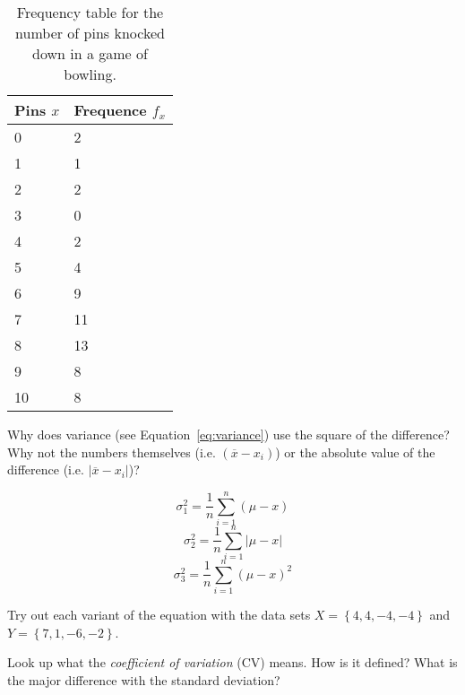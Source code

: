 \begin{table}
  \centering
  \begin{tabular}{@{}ll@{}}
    \toprule
    Pins $x$ & Frequence $f_{x}$ \\ \midrule
    0        & 2                 \\
    1        & 1                 \\
    2        & 2                 \\
    3        & 0                 \\
    4        & 2                 \\
    5        & 4                 \\
    6        & 9                 \\
    7        & 11                \\
    8        & 13                \\
    9        & 8                 \\
    10       & 8                 \\ \bottomrule
  \end{tabular}
  \caption{Frequency table for the number of pins knocked down in a game of bowling.}
  \label{tab:pinfreq}
\end{table}

\begin{exercise}
  \label{ex:variance-formula}
  Why does variance (see Equation~\ref{eq:variance}) use the square of the difference? Why not the numbers themselves (i.e. $(\overline{x} - x_i)$) or the absolute value of the difference (i.e. $\left|\overline{x} - x_i\right|$)?
  
  \[ \sigma^{2}_{1} = \frac{1}{n} \sum_{i=1}^{n} (\mu - x) \]
  \[ \sigma^{2}_{2} = \frac{1}{n} \sum_{i=1}^{n} \left| \mu - x\right| \]
  \[ \sigma^{2}_{3} = \frac{1}{n} \sum_{i=1}^{n} (\mu - x)^{2} \]
  
  Try out each variant of the equation with the data sets $X = \left\{4,4,-4,-4\right\}$ and $Y = \left\{7,1,-6,-2\right\}$.
\end{exercise}

\begin{exercise}
  Look up what the \emph{coefficient of variation} (CV) means. How is it defined? What is the major difference with the standard deviation?
\end{exercise}

